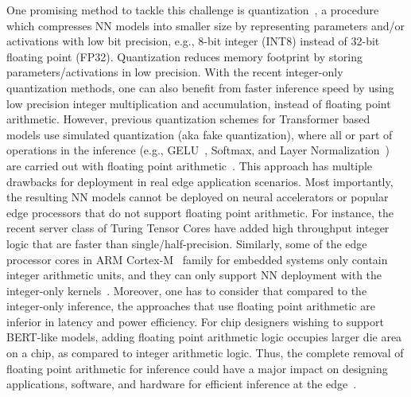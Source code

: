 One promising method to tackle this challenge is quantization~\cite{krishnamoorthi2018quantizing, dong2019hawq,wu2018mixed,zhang2018lq,wu2016quantized, jacob2018quantization},
a procedure which compresses NN models into smaller size by representing parameters and/or activations with low bit precision, e.g., 8-bit integer (INT8) instead of 32-bit floating point (FP32). 
Quantization reduces memory footprint by storing parameters/activations in low precision.
With the recent integer-only quantization methods, one can also benefit from faster inference speed by using
low precision integer multiplication and accumulation, instead of floating point arithmetic.
However, previous quantization schemes for Transformer based models use simulated quantization (aka fake quantization),
where all or part of operations in the inference (e.g., GELU~\cite{hendrycks2016gaussian}, Softmax, and Layer Normalization~\cite{ba2016layer}) are carried out with floating point arithmetic~\cite{shen2020q,zafrir2019q8bert,bhandare2019efficient}. 
This approach has multiple drawbacks for deployment in real edge application scenarios.
Most importantly, the resulting NN models cannot be deployed on neural accelerators or popular edge processors that do not support floating point arithmetic.
For instance, the recent server class of Turing Tensor Cores have added
high throughput integer logic that are faster than single/half-precision.
Similarly,
some of the edge processor cores in ARM Cortex-M~\cite{armcortexm} family for embedded systems only contain integer arithmetic units, and they can only support NN deployment with the integer-only kernels~\cite{lai2018cmsis}.
Moreover, one has to consider that compared to the integer-only inference, the approaches that use floating point arithmetic are inferior in latency and power efficiency. 
For chip designers wishing to support BERT-like models, adding floating point arithmetic logic occupies larger die area on a chip, as compared to integer arithmetic logic.
Thus, the complete removal of floating point arithmetic for inference could have a major impact on designing applications, software, and hardware for efficient inference at the edge~\cite{armcortexm}.


